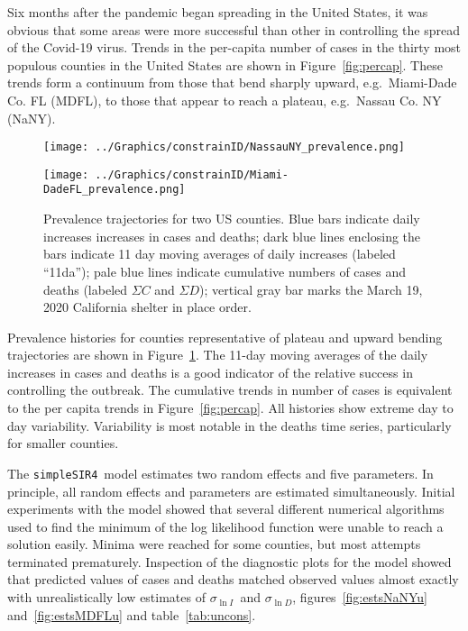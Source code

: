 \documentclass[12pt,letterpaper]{article}
\newcommand\EG{e.g.\ }
\newcommand\SSm{{\tt simpleSIR4}}
\newcommand\slI{$\sigma_{\ln I}$\ }
\newcommand\slD{$\sigma_{\ln D}$}
\begin{document}

Six months after the pandemic began spreading in the United States, it
was obvious that some areas were more successful than other
in controlling the spread of the Covid-19 virus.
Trends in the per-capita number of cases in the thirty most populous 
counties in the United States are shown in Figure~\ref{fig:percap}.
These trends form a continuum from those that bend sharply upward,
\EG Miami-Dade Co. FL (MDFL),  to
those that appear to reach a plateau, \EG Nassau Co. NY (NaNY). 


\begin{figure}
{\scriptsize
\begin{center}
\texttt{[image: ../Graphics/constrainID/NassauNY\_prevalence.png]}
 
\vspace{0.5truein}

\texttt{[image: ../Graphics/constrainID/Miami-DadeFL\_prevalence.png]}
\end{center}
}
\caption{\label{fig:prev}
Prevalence trajectories for two US counties.
Blue bars indicate daily increases increases in cases and deaths;
dark blue lines enclosing the bars indicate 11 day moving averages of
daily increases (labeled ``11da'');
pale blue lines indicate cumulative numbers of cases and deaths
(labeled $\Sigma C$ and $\Sigma D$); 
vertical gray bar marks the March 19, 2020 California shelter in place order.
}
\end{figure}

Prevalence histories for counties representative of plateau
and upward bending trajectories are shown in
Figure~\ref{fig:prev}. The 11-day moving averages of the daily
increases in cases and deaths is a good indicator of the
relative success in controlling the outbreak.
The cumulative trends in number of cases is equivalent to 
the per capita trends in Figure~\ref{fig:percap}.
All histories show extreme day to day variability.
Variability is most notable in the deaths
time series, particularly for smaller counties.

The \SSm\  model estimates two random effects and five parameters.
In principle, all random effects and parameters are estimated
simultaneously.
Initial experiments with the model showed that several different
numerical algorithms used to find the minimum of the log likelihood
function were unable to reach a solution easily. Minima were reached
for some counties, but most attempts terminated prematurely. 
Inspection of the diagnostic plots for the model showed that predicted
values of cases and deaths matched observed values almost exactly
with unrealistically low estimates of \slI and \slD, 
figures~\ref{fig:estsNaNYu} and~\ref{fig:estsMDFLu} and table~\ref{tab:uncons}.
\end{document}
